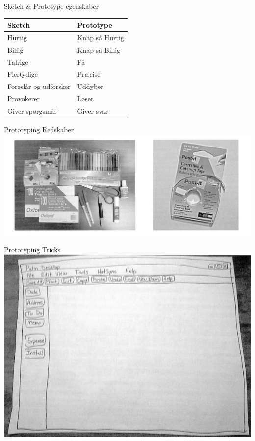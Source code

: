 \documentclass[10pt]{beamer}
\begin{document}
\begin{frame}{Sketch \& Prototype egenskaber}
\begin{center}
  \begin{tabular}{| l | l |}
    \hline
	\textbf{Sketch} & \textbf{Prototype} \\ \hline
    Hurtig & Knap så Hurtig\\ \hline
    Billig & Knap så Billig\\ \hline
    Talrige & Få \\ \hline
    Flertydige & Præcise \\ \hline
    Foreslår og udforsker & Uddyber \\ \hline
    Provokerer & Løser \\ \hline
    Giver spørgsmål & Giver svar \\ \hline
  \end{tabular}
\end{center}
\end{frame}


\begin{frame}{Prototyping Redskaber}
\centering
	\includegraphics[width=\linewidth]{img/tapeandtools.png}
\end{frame}

\begin{frame}{Prototyping Tricks}
\centering
	\includegraphics[width=\linewidth]{img/desktopsketch.png}
\end{frame}
\end{document}
